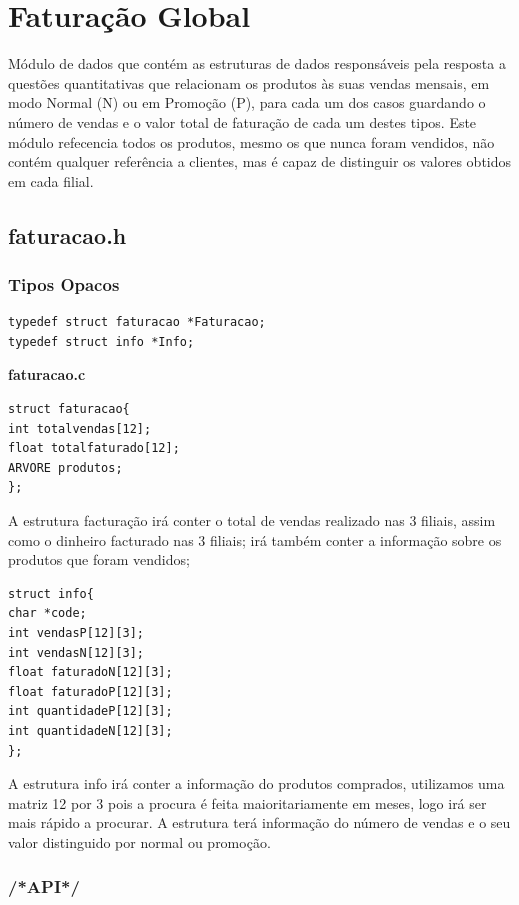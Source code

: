 \section{Faturação Global}

Módulo de dados que contém as estruturas de dados responsáveis pela resposta a questões quantitativas que relacionam os produtos às suas vendas mensais, em modo Normal (N) ou em Promoção (P), para cada um dos casos guardando o número de vendas e o valor total de faturação de cada um destes tipos. Este módulo refecencia todos os produtos, mesmo os que nunca foram vendidos, não contém qualquer referência a clientes, mas é capaz de distinguir os valores obtidos em cada filial. 

\subsection{faturacao.h}

\subsubsection{Tipos Opacos}
\begin{Verbatim}
typedef struct faturacao *Faturacao;
typedef struct info *Info;
\end{Verbatim}

\textbf{faturacao.c}
\begin{verbatim}
struct faturacao{
int totalvendas[12];
float totalfaturado[12];
ARVORE produtos;
};
\end{verbatim}

A estrutura facturação irá conter o total de vendas realizado nas 3 filiais, assim como o dinheiro facturado nas 3 filiais; irá também conter a informação sobre os produtos que foram vendidos; 

\begin{verbatim}
struct info{
char *code;
int vendasP[12][3];
int vendasN[12][3];
float faturadoN[12][3];
float faturadoP[12][3];
int quantidadeP[12][3];
int quantidadeN[12][3];
};
\end{verbatim}

A estrutura info irá conter a informação  do produtos comprados, utilizamos uma matriz 12 por 3 pois a procura é feita maioritariamente em meses, logo irá ser mais rápido a procurar. A estrutura terá informação do número de vendas e o seu valor distinguido por normal ou promoção. 

\subsubsection{/*API*/}


